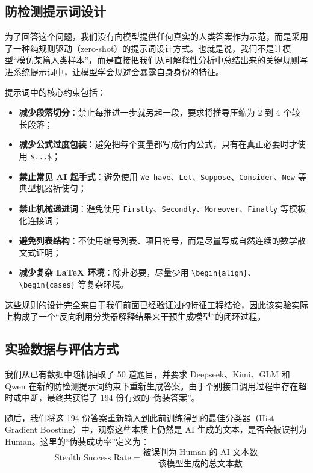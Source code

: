 \documentclass[11pt, a4paper]{ctexart}
\begin{document}
\subsection{防检测提示词设计}
为了回答这个问题，我们没有向模型提供任何真实的人类答案作为示范，而是采用了一种纯规则驱动（zero-shot）的提示词设计方式。也就是说，我们不是让模型“模仿某篇人类样本”，而是直接把我们从可解释性分析中总结出来的关键规则写进系统提示词中，让模型学会规避会暴露自身身份的特征。

提示词中的核心约束包括：
\begin{itemize}
    \item \textbf{减少段落切分}：禁止每推进一步就另起一段，要求将推导压缩为 2 到 4 个较长段落；
    \item \textbf{减少公式过度包装}：避免把每个变量都写成行内公式，只有在真正必要时才使用 \verb|$...$|；
    \item \textbf{禁止常见 AI 起手式}：避免使用 \texttt{We have}、\texttt{Let}、\texttt{Suppose}、\texttt{Consider}、\texttt{Now} 等典型机器祈使句；
    \item \textbf{禁止机械递进词}：避免使用 \texttt{Firstly}、\texttt{Secondly}、\texttt{Moreover}、\texttt{Finally} 等模板化连接词；
    \item \textbf{避免列表结构}：不使用编号列表、项目符号，而是尽量写成自然连续的数学散文式证明；
    \item \textbf{减少复杂 LaTeX 环境}：除非必要，尽量少用 \verb|\begin{align}|、\verb|\begin{cases}| 等复杂环境。
\end{itemize}

这些规则的设计完全来自于我们前面已经验证过的特征工程结论，因此该实验实际上构成了一个“反向利用分类器解释结果来干预生成模型”的闭环过程。

\subsection{实验数据与评估方式}
我们从已有数据中随机抽取了 50 道题目，并要求 Deepseek、Kimi、GLM 和 Qwen 在新的防检测提示词约束下重新生成答案。由于个别接口调用过程中存在超时或中断，最终共获得了 194 份有效的“伪装答案”。

随后，我们将这 194 份答案重新输入到此前训练得到的最佳分类器（Hist Gradient Boosting）中，观察这些本质上仍然是 AI 生成的文本，是否会被误判为 Human。这里的“伪装成功率”定义为：
\[
\text{Stealth Success Rate} = \frac{\text{被误判为 Human 的 AI 文本数}}{\text{该模型生成的总文本数}}
\]
\end{document}
